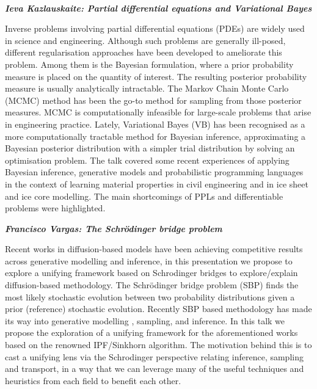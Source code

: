 ~

\emph{\textbf{Ieva Kazlauskaite: Partial differential equations and
Variational Bayes}}

Inverse problems involving partial differential equations (PDEs) are
widely used in science and engineering. Although such problems are
generally ill-posed, different regularisation approaches have been
developed to ameliorate this problem. Among them is the Bayesian
formulation, where a prior probability measure is placed on the quantity
of interest. The resulting posterior probability measure is usually
analytically intractable. The Markov Chain Monte Carlo (MCMC) method has
been the go-to method for sampling from those posterior measures. MCMC
is computationally infeasible for large-scale problems that arise in
engineering practice. Lately, Variational Bayes (VB) has been recognised
as a more computationally tractable method for Bayesian inference,
approximating a Bayesian posterior distribution with a simpler trial
distribution by solving an optimisation problem. The talk covered some
recent experiences of applying Bayesian inference, generative models and
probabilistic programming languages in the context of learning material
properties in civil engineering and in ice sheet and ice core modelling.
The main shortcomings of PPLs and differentiable problems were
highlighted.~

\emph{\textbf{Francisco Vargas: The Schrödinger bridge problem}}

Recent works in diffusion-based models have been achieving competitive
results across generative modelling and inference, in this presentation
we propose to explore a unifying framework based on Schrodinger bridges
to explore/explain diffusion-based methodology. The Schrödinger bridge
problem (SBP) finds the most likely stochastic evolution between two
probability distributions given a prior (reference) stochastic
evolution. Recently SBP based methodology has made its way into
generative modelling , sampling, and inference. In this talk we propose
the exploration of a unifying framework for the aforementioned works
based on the renowned IPF/Sinkhorn algorithm. The motivation behind this
is to cast a unifying lens via the Schrodinger perspective relating
inference, sampling and transport, in a way that we can leverage many of
the useful techniques and heuristics from each field to benefit each
other.

